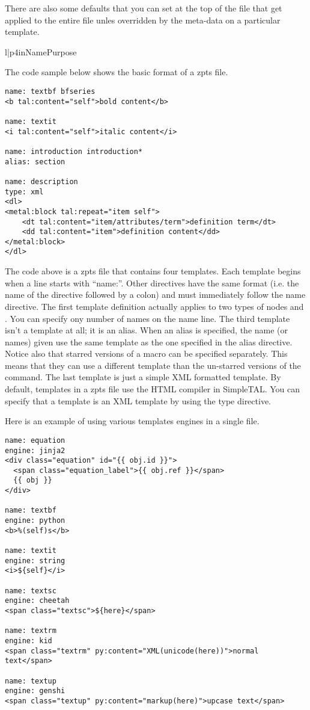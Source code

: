There are also some defaults that you can set at the top of the file that
get applied to the entire file unles overridden by the meta-data on a
particular template.
\begin{tableii}{l|p{4in}}{}{Name}{Purpose}
\end{tableii}

The code sample below shows the basic format of a zpts file.
\begin{verbatim}
name: textbf bfseries
<b tal:content="self">bold content</b>

name: textit
<i tal:content="self">italic content</i>

name: introduction introduction*
alias: section

name: description
type: xml
<dl>
<metal:block tal:repeat="item self">
    <dt tal:content="item/attributes/term">definition term</dt>
    <dd tal:content="item">definition content</dd>
</metal:block>
</dl>
\end{verbatim}

The code above is a zpts file that contains four templates.  Each template
begins when a line starts with ``name:''.  Other directives have the same
format (i.e. the name of the directive followed by a colon) and must
immediately follow the name directive.  The first template definition
actually applies to two types of nodes  and .
You can specify ony number of names on the name line.  The third template
isn't a template at all; it is an alias.  When an alias is specified,
the name (or names) given use the same template as the one specified
in the alias directive.  Notice also that starred versions of a macro
can be specified separately.  This means that they can use a different
template than the un-starred versions of the command.
The last template is just a simple XML formatted
template.  By default, templates in a zpts file use the HTML compiler
in SimpleTAL.  You can specify that a template is an XML template by using
the type directive.

Here is an example of using various templates engines in a single file.
\begin{verbatim}
name: equation
engine: jinja2
<div class="equation" id="{{ obj.id }}">
  <span class="equation_label">{{ obj.ref }}</span>
  {{ obj }}
</div>

name: textbf
engine: python
<b>%(self)s</b>

name: textit
engine: string
<i>${self}</i>

name: textsc
engine: cheetah
<span class="textsc">${here}</span>

name: textrm
engine: kid
<span class="textrm" py:content="XML(unicode(here))">normal text</span>

name: textup
engine: genshi
<span class="textup" py:content="markup(here)">upcase text</span>
\end{verbatim}

